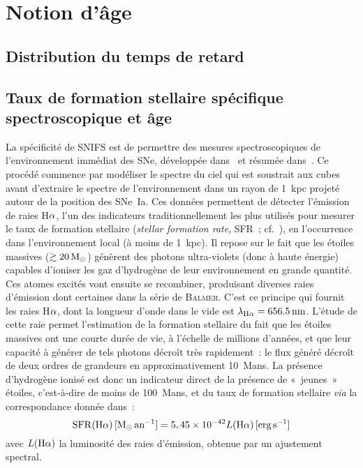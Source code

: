 \documentclass[../main/main.tex]{subfiles}
\begin{document}
\section{Notion d'âge}\label{ssec:spectro}
\subsection{Distribution du temps de retard}\label{sssec:dtd}
\subsection{Taux de formation stellaire spécifique
spectroscopique et âge}\label{ssec:lssfr}

La spécificité de SNIFS est de permettre des mesures spectroscopiques de
l'environnement immédiat des SNe, développée dans~\cite{rigault2013} et résumée
dans~\cite{rigault2020}. Ce procédé commence par modéliser le spectre du ciel
qui est soustrait aux cubes avant d'extraire le spectre de l'environnement dans
un rayon de \SI{1}{kpc} projeté autour de la position des SNe~Ia. Ces données
permettent de détecter l'émission de raies H$\a$, l'un des indicateurs
traditionnellement les plus utilisés pour mesurer le taux de formation stellaire
(\textit{stellar formation rate}, SFR~; cf.~\cite{kennicutt1998}), en
l'occurrence dans l'environnement local (à moins de \SI{1}{kpc}). Il repose sur
le fait que les étoiles massives ($\gtrsim \SI{20}{\Msun}$) génèrent des photons
ultra-violets (donc à haute énergie) capables d'ioniser les gaz d'hydrogène de
leur environnement \citep{calzetti2013} en grande quantité. Ces atomes excités
vont ensuite se recombiner, produisant diverses raies d'émission dont certaines
dans la série de \textsc{Balmer}. C'est ce principe qui fournit les raies H$\a$,
dont la longueur d'onde dans le vide est $\lambda_{\mathrm{H}\a} =
\SI{656.5}{nm}$. L'étude de cette raie permet l'estimation de la formation
stellaire du fait que les étoiles massives ont une courte durée de vie, à
l'échelle de millions d'années, et que leur capacité à générer de tels photons
décroît très rapidement~: le flux généré décroît de deux ordres de grandeurs
en approximativement \SI{10}{Mans}. La présence d'hydrogène ionisé est donc un
indicateur direct de la présence de «~jeunes~» étoiles, c'est-à-dire de moins de
\SI{100}{Mans}, et du taux de formation stellaire \textit{via} la
correspondance donnée dans~\cite{calzetti2013}:
\begin{equation}\label{eq:sfrha}
    \mathrm{SFR}(\mathrm{H}\alpha)\,[\si{\Msun.an^{-1}}] =
    5,45\times 10^{-42}L(\mathrm{H}\a)\,[\si{erg.s^{-1}}]
\end{equation}
avec $L(\mathrm{H}\a)$ la luminosité des raies d'émission, obtenue par un
ajustement spectral.
\end{document}
